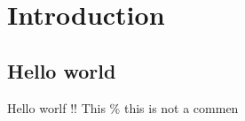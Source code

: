 \documentclass[UTF8]{ctexart}
\begin{document}
\section*{Introduction}

\subsection*{Hello world}
Hello worlf !! %
This \% this is not a commen
\end{document}
